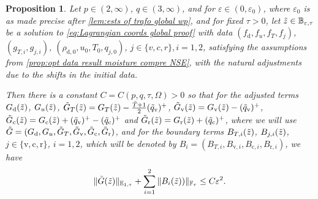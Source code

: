\documentclass[10pt]{amsart}
\theoremstyle{plain}
\newtheorem{prop}[prop]{Proposition}
\theoremstyle{definition}
\theoremstyle{thm}
\numberwithin{equation}{section}
\newcommand{\E}{\mathbb{E}}
\newcommand{\F}{\mathbb{F}}
\newcommand{\eps}{\varepsilon}
\newcommand{\rd}{\mathrm{d}}
\newcommand{\rr}{\mathrm{r}}
\newcommand{\rv}{\mathrm{v}}
\newcommand{\rc}{\mathrm{c}}
\newcommand{\tz}{\Tilde{z}}
\newcommand{\tq}{\Tilde{q}}
\begin{document}
\begin{prop}\label{prop: nonlin est global}
Let $p \in (2,\infty)$, $q \in (3,\infty)$, and for $\eps \in (0,\eps_0)$, where $\eps_0$ is as made precise after \autoref{lem:ests of trafo global wp}, and for fixed $\tau > 0$, let $\tz \in \mathbb{B}_{\eps,\tau}$ be a solution to \eqref{eq:Lagrangian coords global proof} with data $(f_{\rd},f_u,f_T,f_j)$, $(g_{T,i},g_{j,i})$, $(\rho_{\rd,0},u_{0}, T_{0}, q_{j,0})$, $j\in \{v,c,r\}, i=1,2$, satisfying the assumptions from \autoref{prop:opt data result moisture compre NSE}, with the natural adjustments due to the shifts in the initial data. 

Then there is a constant $C = C(p,q,\tau,\Omega) > 0$ so that for the adjusted terms
$G_\rd(\tz)$, $G_u(\tz)$, $\tilde{G}_T(\tz) = G_T(\tz) - \frac{\bar{T}+1}{2} (\tq_{\rv})^+$, $\tilde{G}_\rv(\tz) = G_\rv(\tz) - (\tq_{\rv})^+$, $\tilde{G}_\rc(\tz) = G_\rc(\tz)+(\tq_{\rv})^+ - (\tq_{\rc})^+$ and $\tilde{G}_\rr(\tz) = G_\rr(\tz)+ (\tq_{\rc})^+$, where we will use $\Tilde{G} = (G_\rd,G_u,\tilde{G}_T,\tilde{G}_\rv,\tilde{G}_\rc,\tilde{G}_\rr)$, and for the boundary terms $B_{T,i}(\tz)$, $B_{j,i}(\tz)$, $j \in \{\rv,\rc,\rr\}$, $i=1,2$, which will be denoted by $B_i = (B_{T,i},B_{\rv,i},B_{\rc,i},B_{\rr,i})$, we have
\begin{equation*}
    \begin{aligned}
        \| \Tilde{G}(\tz) \|_{\E_{1,\tau}} + \sum_{i=1}^2 \| B_i(\tz))\|_{\F_\tau} \le  C\eps^{2}.
    \end{aligned}
\end{equation*}
\end{prop}
\end{document}
